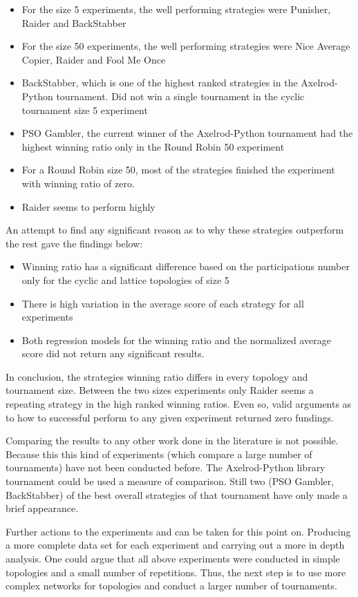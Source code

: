 \begin{itemize}
  \item For the size 5 experiments, the well performing strategies were Punisher,
        Raider and BackStabber
  \item For the size 50 experiments, the well performing strategies were Nice
        Average Copier, Raider and Fool Me Once
  \item BackStabber, which is one of the highest ranked strategies in the
        Axelrod-Python tournament. Did not win a single tournament in the cyclic
        tournament size 5 experiment
  \item PSO Gambler, the current winner of the Axelrod-Python tournament had the
        highest winning ratio only in the Round Robin 50 experiment
  \item For a Round Robin size 50, most of the strategies finished the experiment
        with winning ratio of zero.
  \item Raider seems to perform highly
\end{itemize}

An attempt to find any significant reason as to why these strategies outperform
the rest gave the findings below:

\begin{itemize}
  \item Winning ratio has a significant difference based on the participations
        number only for the cyclic and lattice topologies of size 5
  \item There is high variation in the average score of each strategy for all
        experiments
  \item Both regression models for the winning ratio and the normalized average
        score did not return any significant results.
\end{itemize}

In conclusion, the strategies winning ratio differs in every topology and
tournament size.
Between the two sizes experiments only Raider seems a repeating strategy in the
high ranked winning ratios. Even so, valid arguments as to how to
successful perform to any given experiment returned zero fundings.

Comparing the results to any other work done in the literature is not possible.
Because this this kind of experiments (which compare a large number of tournaments)
have not been conducted before.
The Axelrod-Python library tournament could be used  a measure of comparison.
Still two (PSO Gambler, BackStabber) of the best overall strategies of that
tournament have only made a brief appearance.

Further actions to the experiments and can be taken for this point on.
Producing a more complete data set for each experiment and carrying out a more
in depth analysis. One could argue that all above experiments
were conducted in simple topologies and a small number of repetitions. Thus, the
next step is to use more complex networks for topologies and conduct a larger
number of tournaments.
